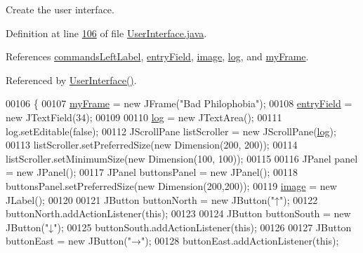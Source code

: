 Create the user interface. 



Definition at line \hyperlink{UserInterface_8java_source_l00106}{106} of file \hyperlink{UserInterface_8java_source}{User\-Interface.\-java}.



References \hyperlink{UserInterface_8java_source_l00041}{commands\-Left\-Label}, \hyperlink{UserInterface_8java_source_l00026}{entry\-Field}, \hyperlink{UserInterface_8java_source_l00036}{image}, \hyperlink{UserInterface_8java_source_l00031}{log}, and \hyperlink{UserInterface_8java_source_l00021}{my\-Frame}.



Referenced by \hyperlink{UserInterface_8java_source_l00047}{User\-Interface()}.


\begin{DoxyCode}
00106                              \{
00107         \hyperlink{classUserInterface_a1bb844238b260f6d4ae1852b6b1e0b97}{myFrame} = \textcolor{keyword}{new} JFrame(\textcolor{stringliteral}{"Bad Philophobia"});
00108         \hyperlink{classUserInterface_a940367d996e9e7ad6e1fa1abfe35128b}{entryField} = \textcolor{keyword}{new} JTextField(34);
00109 
00110         \hyperlink{classUserInterface_a7f6ed10812f99e2cc6ce5f497d8ba2a0}{log} = \textcolor{keyword}{new} JTextArea();
00111         log.setEditable(\textcolor{keyword}{false});
00112         JScrollPane listScroller = \textcolor{keyword}{new} JScrollPane(\hyperlink{classUserInterface_a7f6ed10812f99e2cc6ce5f497d8ba2a0}{log});
00113         listScroller.setPreferredSize(\textcolor{keyword}{new} Dimension(200, 200));
00114         listScroller.setMinimumSize(\textcolor{keyword}{new} Dimension(100, 100));
00115 
00116         JPanel panel = \textcolor{keyword}{new} JPanel();
00117         JPanel buttonsPanel = \textcolor{keyword}{new} JPanel();
00118         buttonsPanel.setPreferredSize(\textcolor{keyword}{new} Dimension(200,200));
00119         \hyperlink{classUserInterface_a0d115eb19b54f3e002ec6aa0fcfb1db4}{image} = \textcolor{keyword}{new} JLabel();
00120 
00121         JButton buttonNorth = \textcolor{keyword}{new} JButton(\textcolor{stringliteral}{"↑"});
00122         buttonNorth.addActionListener(\textcolor{keyword}{this});
00123 
00124         JButton buttonSouth = \textcolor{keyword}{new} JButton(\textcolor{stringliteral}{"↓"});
00125         buttonSouth.addActionListener(\textcolor{keyword}{this});
00126 
00127         JButton buttonEast = \textcolor{keyword}{new} JButton(\textcolor{stringliteral}{"→"});
00128         buttonEast.addActionListener(\textcolor{keyword}{this});

\end{DoxyCode}
